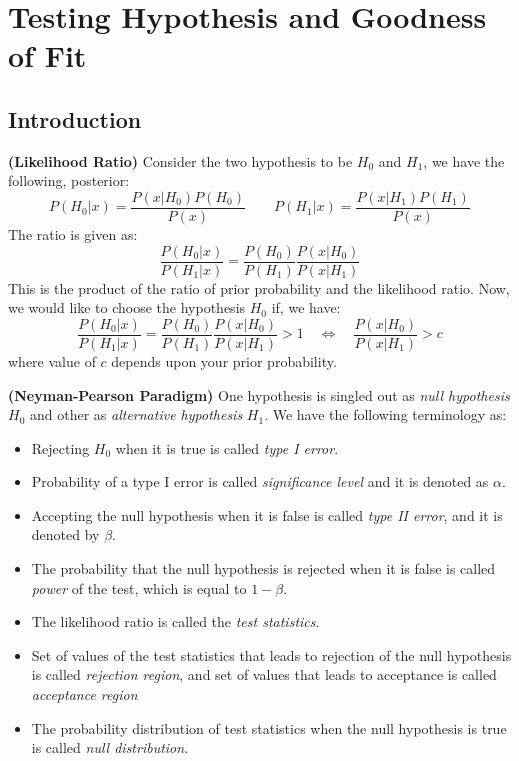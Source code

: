 \section{Testing Hypothesis and Goodness of Fit}

\subsection{Introduction}

\begin{definition}{\textbf{(Likelihood Ratio)}}
    Consider the two hypothesis to be $H_0$ and $H_1$, we have the following, posterior:
    \begin{equation*}
        P(H_0 | x) = \frac{P(x|H_0)P(H_0)}{P(x)} \qquad P(H_1 | x) = \frac{P(x|H_1)P(H_1)}{P(x)} 
    \end{equation*}    
    The ratio is given as:
    \begin{equation*}
        \frac{P(H_0|x)}{P(H_1|x)} = \frac{P(H_0)}{P(H_1)}\frac{P(x|H_0)}{P(x|H_1)}
    \end{equation*}
    This is the product of the ratio of prior probability and the likelihood ratio. Now, we would like to choose the hypothesis $H_0$ if, we have:
    \begin{equation*}
        \frac{P(H_0|x)}{P(H_1|x)} = \frac{P(H_0)}{P(H_1)}\frac{P(x|H_0)}{P(x|H_1)} > 1 \quad \iff \quad 
        \frac{P(x|H_0)}{P(x|H_1)} > c
    \end{equation*}
    where value of $c$ depends upon your prior probability. 
\end{definition}

\begin{definition}{\textbf{(Neyman-Pearson Paradigm)}}
    One hypothesis is singled out as \emph{null hypothesis} $H_0$ and other as \emph{alternative hypothesis} $H_1$. We have the following terminology as:
    \begin{itemize}
        \item Rejecting $H_0$ when it is true is called \emph{type I error}.
        \item Probability of a type I error is called \emph{significance level} and it is denoted as $\alpha$.
        \item Accepting the null hypothesis when it is false is called \emph{type II error}, and it is denoted by $\beta$. 
        \item The probability that the null hypothesis is rejected when it is false is called \emph{power} of the test, which is equal to $1-\beta$.
        \item The likelihood ratio is called the \emph{test statistics}.
        \item Set of values of the test statistics that leads to rejection of the null hypothesis is called \emph{rejection region}, and set of values that leads to acceptance is called \emph{acceptance region}
        \item The probability distribution of test statistics when the null hypothesis is true is called \emph{null distribution}.
    \end{itemize}
\end{definition}

